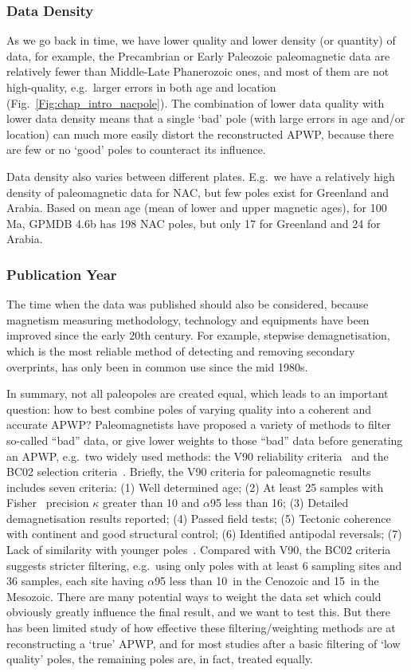\subsubsection{Data Density}

As we go back in time, we have lower quality and lower density (or quantity) of
data, for example, the Precambrian or Early Paleozoic paleomagnetic data are
relatively fewer than Middle-Late Phanerozoic ones, and most of them are not
high-quality, e.g.\ larger errors in both age and location
(Fig.~\ref{Fig:chap_intro_nacpole}). The combination of lower data quality with lower data
density means that a single `bad' pole (with large errors in age and/or
location) can much more easily distort the reconstructed APWP, because there
are few or no `good' poles to counteract its influence.

Data density also varies between different plates. E.g.\ we have a relatively
high density of paleomagnetic data for NAC, but few poles exist for Greenland
and Arabia. Based on mean age (mean of lower and upper magnetic ages), for
100 Ma, GPMDB 4.6b has 198 NAC poles, but only 17 for Greenland and
24 for Arabia.

\subsubsection{Publication Year}

The time when the data was published should also be considered, because
magnetism measuring methodology, technology and equipments have been improved
since the early 20th century. For example, stepwise demagnetisation, which is
the most reliable method of detecting and removing secondary overprints, has
only been in common use since the mid 1980s.

In summary, not all paleopoles are created equal, which leads to an
important question: how to best combine poles of varying quality into a
coherent and accurate APWP\@? Paleomagnetists have proposed a variety of methods
to filter so-called ``bad'' data, or give lower weights to those ``bad'' data
before generating an APWP, e.g.\ two widely used methods: the V90 reliability
criteria~\citep{v90} and the BC02 selection criteria~\citep{B02}. Briefly, the V90
criteria for paleomagnetic results includes seven criteria: (1) Well determined
age; (2) At least 25 samples with Fisher~\citep{F53} precision $\kappa$ greater
than 10 and $\alpha$95 less than 16\degree; (3) Detailed demagnetisation results
reported; (4) Passed field tests; (5) Tectonic coherence with continent and good
structural control; (6) Identified antipodal reversals; (7) Lack of similarity
with younger poles~\citep{T92}. Compared with V90, the BC02 criteria suggests
stricter filtering, e.g.\ using only poles with at least 6 sampling sites and 36
samples, each site having $\alpha$95 less than 10\degree\ in the Cenozoic and
15\degree\ in the Mesozoic. There are many potential ways to weight the data set
which could obviously greatly influence the final result, and we want to test
this. But there has been limited study of how effective these
filtering/weighting methods are at reconstructing a `true' APWP, and for most
studies after a basic filtering of `low quality' poles, the remaining poles are,
in fact, treated equally.

